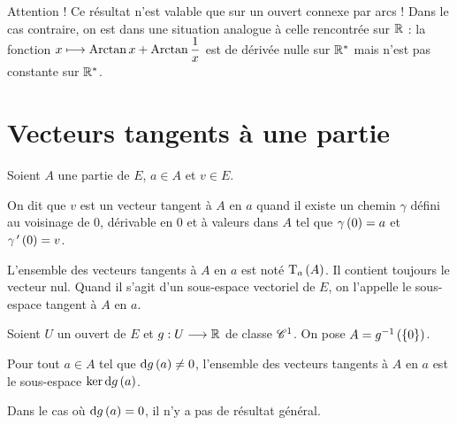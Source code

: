 \begin{rem}
Attention ! Ce résultat n'est valable que sur un ouvert connexe par arcs ! Dans le cas contraire, on est dans une situation analogue à celle rencontrée sur \(\mathbb{R}\) : la fonction \(x\longmapsto\operatorname{Arctan} x+\operatorname{Arctan}\dfrac{1}{x}\) est de dérivée nulle sur \(\mathbb{R}^*\) mais n'est pas constante sur \(\mathbb{R}^*\).
\end{rem}

\section{Vecteurs tangents à une partie}

\begin{defi}
Soient \(A\) une partie de \(E\), \(a\in A\) et \(v\in E\).

On dit que \(v\) est un vecteur tangent à \(A\) en \(a\) quand il existe un chemin \(\gamma\) défini au voisinage de \(0\), dérivable en \(0\) et à valeurs dans \(A\) tel que \(\gamma\left(0\right)=a\) et \(\gamma^{\,\prime}\left(0\right)=v\).
\end{defi}

L'ensemble des vecteurs tangents à \(A\) en \(a\) est noté \(\operatorname{T}_{a}\left(A\right)\). Il contient toujours le vecteur nul. Quand il s'agit d'un sous-espace vectoriel de \(E\), on l'appelle le sous-espace tangent à \(A\) en \(a\).

\begin{prop}
Soient \(U\) un ouvert de \(E\) et \(g:U\longrightarrow\mathbb{R}\) de classe \(\mathscr{C}^{1}\). On pose \(A=g^{-1}\left(\left\lbrace0\right\rbrace\right)\).

Pour tout \(a\in A\) tel que \(\odif{g}\paren{a}\not=0\), l'ensemble des vecteurs tangents à \(A\) en \(a\) est le sous-espace \(\ker\odif{g}\paren{a}\).
\end{prop}

Dans le cas où \(\odif{g}\paren{a}=0\), il n'y a pas de résultat général.

